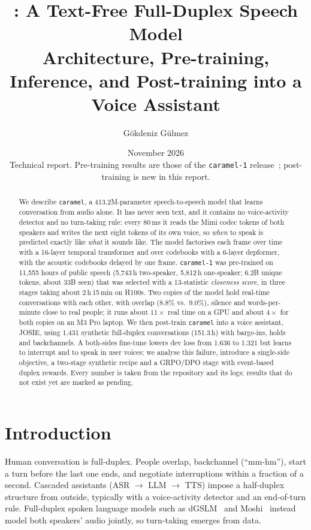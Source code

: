 \documentclass[10pt]{article}
\title{\caramel{}: A Text-Free Full-Duplex Speech Model\\[2pt]
\large Architecture, Pre-training, Inference, and Post-training into a Voice Assistant}
\author{G\"okdeniz G\"ulmez}
\date{November 2026 \\ \small Technical report. Pre-training results are those of the \texttt{caramel-1} release~\cite{caramel1}; post-training is new in this report.}
\newcommand{\caramel}{\texttt{caramel}}
\newcommand{\josie}{JOSIE}
\begin{document}
\maketitle

\begin{abstract}
We describe \caramel{}, a 413.2M-parameter speech-to-speech model that learns conversation from audio alone. It has never seen text, and it contains no voice-activity detector and no turn-taking rule: every 80\,ms it reads the Mimi codec tokens of both speakers and writes the next eight tokens of its own voice, so \emph{when} to speak is predicted exactly like \emph{what} it sounds like.
The model factorises each frame over time with a 16-layer temporal transformer and over codebooks with a 6-layer depformer, with the acoustic codebooks delayed by one frame.
\texttt{caramel-1} was pre-trained on 11{,}555 hours of public speech (5{,}743\,h two-speaker, 5{,}812\,h one-speaker; 6.2B unique tokens, about 33B seen) that was selected with a 13-statistic \emph{closeness score}, in three stages taking about 2\,h\,15\,min on H100s.
Two copies of the model hold real-time conversations with each other, with overlap (8.8\% vs.\ 9.0\%), silence and words-per-minute close to real people; it runs about $11\times$ real time on a GPU and about $4\times$ for both copies on an M3 Pro laptop.
We then post-train \caramel{} into a voice assistant, \josie{}, using 1{,}431 synthetic full-duplex conversations (151.3\,h) with barge-ins, holds and backchannels. A both-sides fine-tune lowers dev loss from 1.636 to 1.321 but learns to interrupt and to speak in user voices; we analyse this failure, introduce a single-side objective, a two-stage synthetic recipe and a GRPO/DPO stage with event-based duplex rewards. Every number is taken from the repository and its logs; results that do not exist yet are marked as pending.
\end{abstract}

\tableofcontents
\newpage

\section{Introduction}
Human conversation is full-duplex. People overlap, backchannel (``mm-hm''), start a turn before the last one ends, and negotiate interruptions within a fraction of a second. Cascaded assistants (ASR $\to$ LLM $\to$ TTS) impose a half-duplex structure from outside, typically with a voice-activity detector and an end-of-turn rule. Full-duplex spoken language models such as dGSLM~\cite{nguyen2023dgslm} and Moshi~\cite{defossez2024moshi} instead model both speakers' audio jointly, so turn-taking emerges from data.
\end{document}
